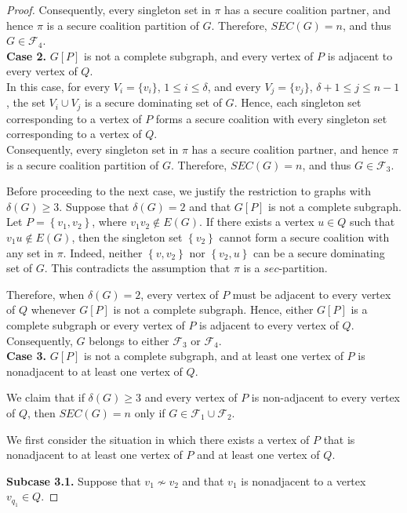 \documentclass[12pt]{article}
\begin{document}
\begin{proof}
Consequently, every singleton set in $\pi$ has a secure coalition partner, and hence $\pi$ is a secure coalition partition of $G$. Therefore, $SEC(G)=n$, and thus $G\in\mathcal{F}_4$.\\[2mm]
\textbf{Case 2.} $G[P]$ is not a complete subgraph, and every vertex of $P$ is adjacent to every vertex of $Q$.\\
In this case, for every $V_i=\{v_i\}$, $1\le i\le \delta$, and every $V_j=\{v_j\}$, $\delta+1\le j\le n-1$, the set $V_i\cup V_j$ is a secure dominating set of $G$. Hence, each singleton set corresponding to a vertex of $P$ forms a secure coalition with every singleton set corresponding to a vertex of $Q$.\\
Consequently, every singleton set in $\pi$ has a secure coalition partner, and hence $\pi$ is a secure coalition partition of $G$. Therefore, $SEC(G)=n$, and thus $G\in\mathcal{F}_3$.

\medskip

Before proceeding to the next case, we justify the restriction to graphs with $\delta(G)\ge 3$. Suppose that $\delta(G)=2$ and that $G[P]$ is not a complete subgraph. Let $P=\left\{v_{1},v_{2}\right\}$, where $v_{1}v_{2}\notin E(G)$. If there exists a vertex $u\in Q$ such that $v_{1}u\notin E(G)$, then the singleton set $\left\{v_2\right\}$ cannot form a secure coalition with any set in $\pi$. Indeed, neither $\left\{v,v_2\right\}$ nor $\left\{v_2,u\right\}$ can be a secure dominating set of $G$. This contradicts the assumption that $\pi$ is a $sec$-partition.

Therefore, when $\delta(G)=2$, every vertex of $P$ must be adjacent to every vertex of $Q$ whenever $G[P]$ is not a complete subgraph. Hence, either $G[P]$ is a complete subgraph or every vertex of $P$ is adjacent to every vertex of $Q$. Consequently, $G$ belongs to either $\mathcal{F}_3$ or $\mathcal{F}_4$.\\[2mm]
\textbf{Case 3.} $G[P]$ is not a complete subgraph, and at least one vertex of $P$ is nonadjacent to at least one vertex of $Q$.

We claim that if $\delta(G)\ge 3$ and  every vertex of $P$ is non-adjacent to every vertex of $Q$, then $SEC(G)=n$ only if $G\in\mathcal{F}_1\cup\mathcal{F}_2$.

We first consider the situation in which there exists a vertex of $P$ that is nonadjacent to at least one vertex of $P$ and at least one vertex of $Q$.

\medskip

\textbf{Subcase 3.1.} Suppose that $v_1\not\sim v_2$ and that $v_1$ is nonadjacent to a vertex $v_{q_1}\in Q$.


\end{proof}
\end{document}

